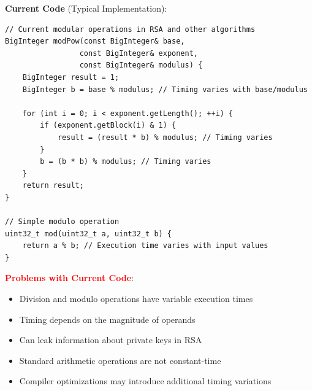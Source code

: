 \documentclass[11pt,a4paper]{article}
\begin{document}
\textbf{Current Code} (Typical Implementation):
\begin{lstlisting}
// Current modular operations in RSA and other algorithms
BigInteger modPow(const BigInteger& base, 
                 const BigInteger& exponent, 
                 const BigInteger& modulus) {
    BigInteger result = 1;
    BigInteger b = base % modulus; // Timing varies with base/modulus
    
    for (int i = 0; i < exponent.getLength(); ++i) {
        if (exponent.getBlock(i) & 1) {
            result = (result * b) % modulus; // Timing varies
        }
        b = (b * b) % modulus; // Timing varies
    }
    return result;
}

// Simple modulo operation
uint32_t mod(uint32_t a, uint32_t b) {
    return a % b; // Execution time varies with input values
}
\end{lstlisting}

\textcolor{red}{\textbf{Problems with Current Code}}:
\begin{itemize}
    \item Division and modulo operations have variable execution times
    \item Timing depends on the magnitude of operands
    \item Can leak information about private keys in RSA
    \item Standard arithmetic operations are not constant-time
    \item Compiler optimizations may introduce additional timing variations
\end{itemize}
\end{document}
